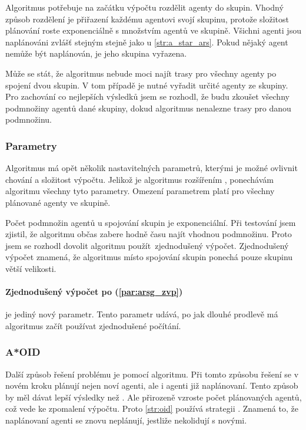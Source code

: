 Algoritmus potřebuje na začátku výpočtu rozdělit agenty do skupin.
Vhodný způsob rozdělení je přiřazení každému agentovi svojí skupinu,
protože složitost plánování roste exponenciálně s množstvím agentů ve skupině.
Všichni agenti jsou naplánováni zvlášť stejným stejně jako u \ref{str:a_star_ars}.
Pokud nějaký agent nemůže být naplánován, je jeho skupina vyřazena.

Může se stát, že algoritmus nebude moci najít trasy pro všechny agenty po spojení dvou skupin.
V tom případě je nutné vyřadit určité agenty ze skupiny.
Pro zachování co nejlepších výsledků jsem se rozhodl, že budu zkoušet všechny podmnožiny agentů dané skupiny,
dokud algoritmus nenalezne trasy pro danou podmnožinu.

\subsubsection{Parametry}\label{subsubsec:arsg_parametry}
Algoritmus má opět několik nastavitelných parametrů, kterými je možné ovlivnit chování a složitost výpočtu.
Jelikož je algoritmus rozšířením , ponechávám algoritmu všechny tyto parametry.
Omezení parametrem platí pro všechny plánované agenty ve skupině.

Počet podmnožin agentů u spojování skupin je exponenciální.
Při testování jsem zjistil, že algoritmu občas zabere hodně času najít vhodnou podmnožinu.
Proto jsem se rozhodl dovolit algoritmu použít\ zjednodušený výpočet.
Zjednodušený výpočet znamená, že algoritmus místo spojování skupin ponechá pouze skupinu větší velikosti.

\paragraph{Zjednodušený výpočet po (\ref{par:arsg_zvp})} je jediný nový parametr.
Tento parametr udává, po jak dlouhé prodlevě má algoritmus začít používat zjednodušené počítání.

\subsubsection{A*OID}\label{subsubsec:a_star_aoid}
Další způsob řešení  problému je pomocí  algoritmu.
Při tomto způsobu řešení se v novém kroku plánují nejen noví agenti, ale i agenti již naplánovaní.
Tento způsob by měl dávat lepší výsledky než .
Ale přirozeně vzroste počet plánovaných agentů, což vede ke zpomalení výpočtu.
Proto \ref{str:oid} používá strategii .
Znamená to, že naplánovaní agenti se znovu neplánují, jestliže nekolidují s novými.

